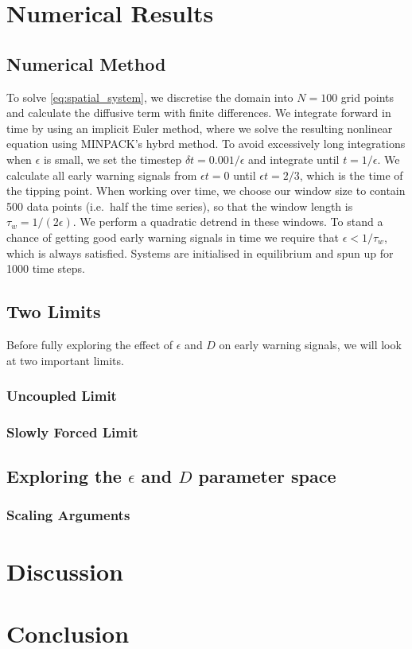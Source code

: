 \section{Numerical Results}
\subsection{Numerical Method}
To solve \cref{eq:spatial_system}, we discretise the domain into $N = 100$ grid
points and 
calculate the diffusive term with finite differences. We integrate forward in time by 
using an implicit Euler method, where we solve the resulting nonlinear equation using 
MINPACK's hybrd method. To avoid excessively long integrations when $\epsilon$ is small,
we set the timestep $\delta t = 0.001/\epsilon$ and integrate until $t=1/\epsilon$. We
calculate all early warning signals from $\epsilon t=0$ until $\epsilon t=2/3$, which is the 
time of the tipping point. When working over time, we choose our window size to 
contain 500 data points (i.e.\ half the time series),
so that the window length is $\tau_w = 1/(2\epsilon)$. We perform a quadratic detrend in these windows.
To stand a chance of getting good early warning
signals in time we require that $\epsilon < 1/\tau_w$, which is always satisfied.
Systems are initialised in equilibrium and spun up for 1000 time steps.
\subsection{Two Limits}
Before fully exploring the effect of $\epsilon$ and $D$ on early warning signals, we will look at two important limits.    
\subsubsection{Uncoupled Limit}
\subsubsection{Slowly Forced Limit}
\subsection{Exploring the $\epsilon$ and $D$ parameter space}
\subsubsection{Scaling Arguments}
\section{Discussion}
\section{Conclusion}
